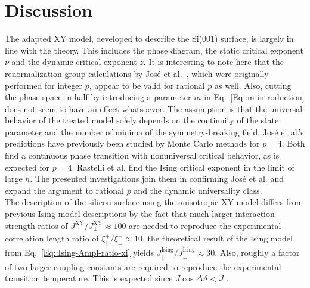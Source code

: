 	\section{Discussion}
	The adapted XY model, developed to describe the Si(001) surface, is largely in line with the theory. This includes the phase diagram, the static critical exponent $\nu$ and the dynamic critical exponent $z$. It is interesting to note here that the renormalization group calculations by José et al.~\cite{jose1977renormalization}, which were originally performed for integer $p$, appear to be valid for rational $p$ as well. Also, cutting the phase space in half by introducing a parameter $m$ in Eq.~\eqref{Eq::m-introduction} does not seem to have an effect whatsoever. The assumption is that the universal behavior of the treated model solely depends on the continuity of the state parameter and the number of minima of the symmetry-breaking field. José et al.'s predictions have previously been studied by Monte Carlo methods \cite{landau1983non, rastelli2004monte} for $p=4$. Both find a continuous phase transition with nonuniversal critical behavior, as is expected for $p=4$. Rastelli et al. \cite{rastelli2004monte} find the Ising critical exponent in the limit of large $h$. The presented investigations join them in confirming José et al. and expand the argument to rational $p$ and the dynamic universality class. \\
	
	The description of the silicon surface using the anisotropic XY model differs from previous Ising model descriptions by the fact that much larger interaction strength ratios of $J_\parallel^{\text{XY}} / J_\perp^{\text{XY}} \approx 100$ are needed to reproduce the experimental correlation length ratio of $\xi_\parallel^+ /	\xi_\perp^+ \approx 10$. the theoretical result of the Ising model from Eq.~\eqref{Eq::Ising-Ampl-ratio-xi} yields $J_\parallel^{\text{Ising}} / J_\perp^{\text{Ising}} \approx 30$. Also, roughly a factor of two larger coupling constants are required to reproduce the experimental transition temperature. This is expected since $J \cos \Delta \vartheta < J$ \cite{aizenman1980comparison}.\\

